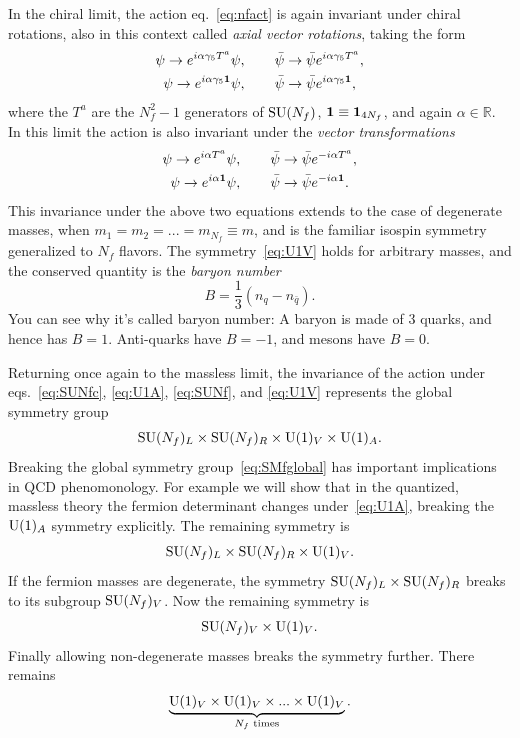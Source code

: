 In the chiral limit, the action eq.~\eqref{eq:nfact} is again invariant under
chiral rotations, also in this context called {\it axial vector rotations},
taking the form
\begin{gather}
  \label{eq:SUNfc}
  \psi\to e^{i\alpha\gamma_5 T^a}\psi,\qquad
    \bar{\psi}\to\bar{\psi}e^{i\alpha\gamma_5 T^a}, \\
  \label{eq:U1A}
  \psi\to e^{i\alpha\gamma_5 {\mathbf 1}}\psi,\qquad
    \bar{\psi}\to\bar{\psi}e^{i\alpha\gamma_5 {\mathbf 1}},
\end{gather}
where the $T^a$ are the $N_f^2-1$ generators of $\operatorname{SU}(N_f)$,
${\mathbf 1}\equiv{\mathbf 1}_{4N_f}$, and again $\alpha\in\mathbb{R}$.
In this limit the action is also invariant under the
{\it vector transformations}
\begin{gather}
  \label{eq:SUNf}
  \psi\to e^{i\alpha T^a}\psi,\qquad
    \bar{\psi}\to\bar{\psi}e^{-i\alpha T^a}, \\
  \label{eq:U1V}
  \psi\to e^{i\alpha {\mathbf 1}}\psi,\qquad
    \bar{\psi}\to\bar{\psi}e^{-i\alpha {\mathbf 1}}.
\end{gather}
This invariance under the above two equations extends to the case of degenerate
masses, when $m_1=m_2=...=m_{N_f}\equiv m$, and is the familiar isospin
symmetry generalized to $N_f$ flavors. The symmetry~\eqref{eq:U1V} holds for
arbitrary masses, and the conserved quantity is the {\it baryon number}
\begin{equation}
    B=\frac{1}{3}(n_q-n_{\bar{q}}).
\end{equation}
You can see why it's called baryon number: A baryon is made of 3
quarks, and hence has $B=1$. Anti-quarks have $B=-1$, and
mesons have $B=0$.

Returning once again to the massless limit, the invariance of the action under
eqs.~\eqref{eq:SUNfc}, \eqref{eq:U1A}, \eqref{eq:SUNf}, and \eqref{eq:U1V}
represents the global symmetry group
\begin{equation}\label{eq:SMfglobal}
  \operatorname{SU}(N_f)_L\times\operatorname{SU}(N_f)_R\times\operatorname{U}(1)_V\times\operatorname{U}(1)_A.
\end{equation}
Breaking the global symmetry group~\eqref{eq:SMfglobal} has important
implications in QCD phenomonology. For example we will show that in the
quantized, massless theory the fermion determinant changes
under~\eqref{eq:U1A}, breaking the $\operatorname{U}(1)_A$ symmetry explicitly. The remaining
symmetry is
\begin{equation}\label{eq:SMglobalbUA}
  \operatorname{SU}(N_f)_L\times\operatorname{SU}(N_f)_R\times\operatorname{U}(1)_V.
\end{equation}
If the fermion masses are degenerate, the symmetry $\operatorname{SU}(N_f)_L\times\operatorname{SU}(N_f)_R$
breaks to its subgroup $\operatorname{SU}(N_f)_V$. Now the remaining symmetry is
\begin{equation}
  \operatorname{SU}(N_f)_V\times\operatorname{U}(1)_V.
\end{equation}
Finally allowing non-degenerate masses breaks the symmetry further. 
There remains
\begin{equation}
  \underbrace{\operatorname{U}(1)_V\times\operatorname{U}(1)_V\times...\times\operatorname{U}(1)_V}_\text{$N_f$ times}.
\end{equation}

